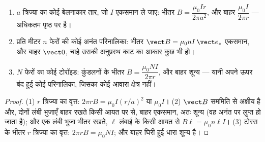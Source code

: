 \begin{proposition}[बेलन, परिनालिका, टोरॉइड]\label{prop:b1:magnetostatics:ampereapps}
\begin{enumerate}
  \item $a$ त्रिज्या का कोई बेलनाकार तार, जो $I$ एकसमान ले जाए:
        भीतर $B = \dfrac{\mu_0Ir}{2\pi a^2}$, और बाहर $\dfrac{\mu_0I}{2\pi r}$
        --- अधिकतम पृष्ठ पर है।
  \item प्रति मीटर $n$ फेरों की कोई अनंत परिनालिका: भीतर $\vect B = \mu_0nI\,
        \vect e_z$ एकसमान, और बाहर $\vect 0$, चाहे उसकी अनुप्रस्थ काट का
        आकार कुछ भी हो।
  \item $N$ फेरों का कोई टोरॉइड: कुंडलनों के भीतर $B = \dfrac{\mu_0NI}{2\pi r}$,
        और बाहर शून्य --- यानी अपने ऊपर बंद हुई कोई परिनालिका, जिसका कोई
        आवारा क्षेत्र नहीं।
\end{enumerate}
\end{proposition}

\begin{proof}
(1) $r$ त्रिज्या का वृत्त: $2\pi rB = \mu_0I(r/a)^2$ या $\mu_0I$। (2) $\vect B$
सममिति से अक्षीय है और, दोनों लंबी भुजाएँ बाहर रखते किसी आयत पर  से,
बाहर एकसमान, अतः शून्य (वह अनंत पर लुप्त हो जाता है); और एक लंबी भुजा भीतर
रखते, $\ell$ लंबाई के किसी आयत से $B\ell =
\mu_0n\ell I$। (3) टोरस के भीतर $r$ त्रिज्या का वृत्त: $2\pi rB =
\mu_0NI$; और बाहर घिरी हुई धारा शून्य है।
\end{proof}

